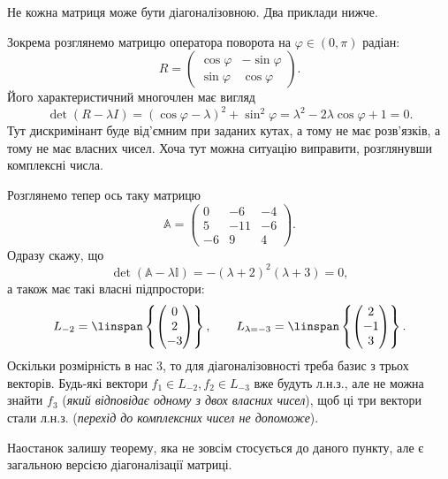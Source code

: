 \documentclass{math_library}
\begin{document}
\begin{remark}
Не кожна матриця може бути діагоналізовною. Два приклади нижче.
\end{remark}

\begin{example}
Зокрема розглянемо матрицю оператора поворота на $\varphi \in (0,\pi)$ радіан: 
\[
R = \begin{pmatrix}
\cos \varphi & -\sin \varphi \\
\sin \varphi & \cos \varphi
\end{pmatrix}.
\] 
Його характеристичний многочлен має вигляд
\[
\det (R - \lambda I) = (\cos \varphi-\lambda)^2 + \sin^2 \varphi = \lambda^2 - 2\lambda \cos \varphi + 1 = 0.
\]
Тут дискримінант буде від'ємним при заданих кутах, а тому не має розв'язків, а тому не має власних чисел. Хоча тут можна ситуацію виправити, розглянувши комплексні числа.
\end{example}

\begin{example}
\label{non_diagonalizable_because_not_enough_dim}
Розглянемо тепер ось таку матрицю
\[
\mathbb{A} = \begin{pmatrix}
0 & -6 & -4 \\
5 & -11 & -6 \\
-6 & 9 & 4
\end{pmatrix}.
\]
Одразу скажу, що
\[
\det (\mathbb{A} - \lambda \mathbb{I}) = -(\lambda+2)^2(\lambda+3)=0,
\]
а також має такі власні підпростори:
\[
L_{-2} = \linspan \left\{ \begin{pmatrix}
0 \\ 2 \\ -3
\end{pmatrix} \right\}, \qquad
L_{\lambda = -3} = \linspan \left\{ \begin{pmatrix}
2 \\ -1 \\ 3
\end{pmatrix} \right\}.
\]
Оскільки розмірність в нас $3$, то для діагоналізовності треба базис з трьох векторів. Будь-які вектори $f_1 \in L_{-2}, f_2 \in L_{-3}$ вже будуть л.н.з., але не можна знайти $f_3$ (\textit{який відповідає одному з двох власних чисел}), щоб ці три вектори стали л.н.з. (\textit{перехід до комплексних чисел не допоможе}).
\end{example}

Наостанок залишу теорему, яка не зовсім стосується до даного пункту, але є загальною версією діагоналізації матриці.
\end{document}
